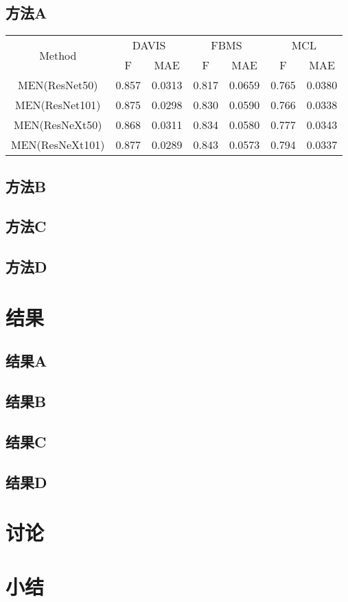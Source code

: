 \subsection{方法A}
\begin{table}[]
\begin{tabular}{|c|c|c|c|c|c|c|}
\hline
\multirow{2}{*}{Method} & \multicolumn{2}{c|}{DAVIS} & \multicolumn{2}{c|}{FBMS} & \multicolumn{2}{c|}{MCL} \\ \cline{2-7} 
 & F & MAE & F & MAE & F & MAE \\ \hline
MEN(ResNet50) & 0.857 & 0.0313 & 0.817 & 0.0659 & 0.765 & 0.0380 \\ \hline
MEN(ResNet101) & 0.875 & 0.0298 & 0.830 & 0.0590 & 0.766 & 0.0338 \\ \hline
MEN(ResNeXt50) & 0.868 & 0.0311 & 0.834 & 0.0580 & 0.777 & 0.0343 \\ \hline
\multicolumn{1}{|l|}{MEN(ResNeXt101)} & \multicolumn{1}{l|}{0.877} & \multicolumn{1}{l|}{0.0289} & \multicolumn{1}{l|}{0.843} & \multicolumn{1}{l|}{0.0573} & \multicolumn{1}{l|}{0.794} & \multicolumn{1}{l|}{0.0337} \\ \hline
\end{tabular}
\end{table}

\subsection{方法B}
\Blindtext

\subsection{方法C}
\Blindtext

\subsection{方法D}
\Blindtext

\section{结果}
\subsection{结果A}
\Blindtext

\subsection{结果B}
\Blindtext

\subsection{结果C}
\Blindtext

\subsection{结果D}
\Blindtext

\section{讨论}
\Blindtext

\section{小结}
\Blindtext 